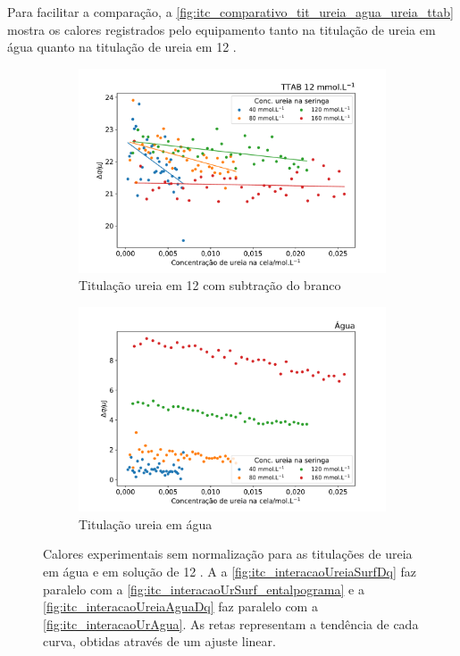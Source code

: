 	 Para facilitar a comparação, a \autoref{fig:itc_comparativo_tit_ureia_agua_ureia_ttab} mostra os calores registrados pelo equipamento tanto na titulação de ureia em água quanto na titulação de ureia em \TTAB{} 12 \mM. 
	 
\begin{figure}[h]
	\begin{subfigure}{0.5\textwidth}
		\centering
		\includegraphics[width=\textwidth]{imagens/itc/interacao_ureia_surf_dq}
		\caption{Titulação ureia em \TTAB{} 12 \mM{} com subtração do branco}
		\label{fig:itc_interacaoUreiaSurfDq}
	\end{subfigure} %
	\begin{subfigure}{0.5\textwidth}
		\centering
		\includegraphics[width=\textwidth]{imagens/itc/interacao_branco_dq}
		\caption{Titulação ureia em água}
		\label{fig:itc_interacaoUreiaAguaDq}
	\end{subfigure} 

	\caption{Calores experimentais sem normalização para as titulações de ureia em água e em solução de \TTAB{} 12 \mM. A a \autoref{fig:itc_interacaoUreiaSurfDq} faz paralelo com a \autoref{fig:itc_interacaoUrSurf_entalpograma} e a \autoref{fig:itc_interacaoUreiaAguaDq} faz paralelo com a \autoref{fig:itc_interacaoUrAgua}. As retas representam a tendência de cada curva, obtidas através de um ajuste linear.}
	\label{fig:itc_comparativo_tit_ureia_agua_ureia_ttab}
\end{figure}
	
